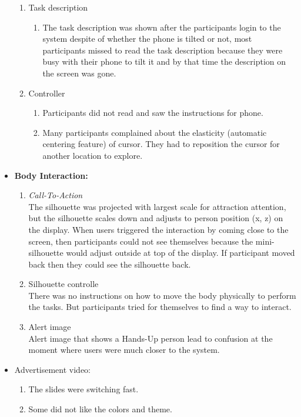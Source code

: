 \begin{itemize}
\begin{enumerate}
\item   Task description
\begin{enumerate}
\item   The task description was shown after the participants login to the system despite of whether the phone is tilted or not, most participants missed to read the task description because they were busy with their phone to tilt it and by that time the description on the screen was gone.
\end{enumerate}

\item   Controller
\begin{enumerate}
\item   Participants did not read and saw the instructions for phone.   
\item   Many participants complained about the elasticity (automatic centering feature) of cursor. They had to reposition the cursor for another location to explore.
\end{enumerate}
\end{enumerate}


\item \textbf{Body Interaction:}

\begin{enumerate}
\item   \emph{Call-To-Action} \\
The silhouette was projected with largest scale for attraction attention, but the silhouette scales down and adjusts to person position (x, z) on the display. When users triggered the interaction by coming close to the screen, then participants could not see themselves because the mini-silhouette would adjust outside at top of the display. If participant moved back then they could see the silhouette back. 

\item   Silhouette controlle \\
There was no instructions on how to move the body physically to perform the tasks. But participants tried for themselves to find a way to interact.

\item   Alert image \\
Alert image that shows a Hands-Up person lead to confusion at the moment where users were much closer to the system.
\end{enumerate}

\item Advertisement video: \\
\begin{enumerate}
\item The slides were switching fast.
\item Some did not like the colors and theme. 
\end{enumerate}


\end{itemize}

